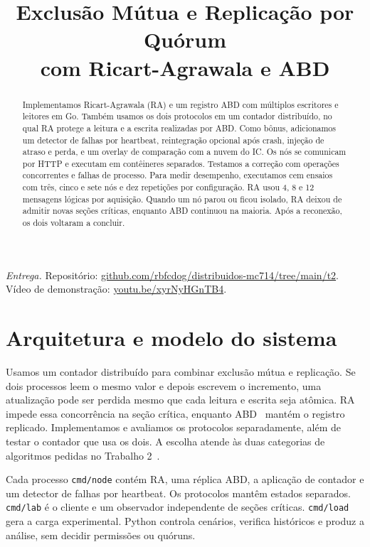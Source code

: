 \documentclass[conference]{IEEEtran}
\title{Exclusão Mútua e Replicação por Quórum\\
com Ricart-Agrawala e ABD}
\author{
\IEEEauthorblockN{%
\begin{tabular}{@{}ccc@{}}
Rodrigo Camargo & André Loubet & Gabriel Eiji M. M. Tomonari \\[0.35em]
\normalsize RA 238257 & \normalsize RA 253333 & \normalsize RA 234774
\end{tabular}}
\IEEEauthorblockA{%
MC714, Sistemas Distribuídos,\\
Universidade Estadual de Campinas}
}
\begin{document}
\maketitle

\begin{abstract}
Implementamos Ricart-Agrawala (RA) e um registro ABD com múltiplos escritores e leitores em Go. Também usamos os dois protocolos em um contador distribuído, no qual RA protege a leitura e a escrita realizadas por ABD. Como bônus, adicionamos um detector de falhas por heartbeat, reintegração opcional após crash, injeção de atraso e perda, e um overlay de comparação com a nuvem do IC. Os nós se comunicam por HTTP e executam em contêineres separados. Testamos a correção com operações concorrentes e falhas de processo. Para medir desempenho, executamos cem ensaios com três, cinco e sete nós e dez repetições por configuração. RA usou 4, 8 e 12 mensagens lógicas por aquisição. Quando um nó parou ou ficou isolado, RA deixou de admitir novas seções críticas, enquanto ABD continuou na maioria. Após a reconexão, os dois voltaram a concluir.
\end{abstract}

{\footnotesize\noindent\textit{Entrega.} Repositório: \href{https://github.com/rbfcdog/distribuidos-mc714/tree/main/t2}{github.com/rbfcdog/distribuidos-mc714/tree/main/t2}. Vídeo de demonstração: \href{https://youtu.be/xyrNyHGnTB4}{youtu.be/xyrNyHGnTB4}.\par}

\section{Arquitetura e modelo do sistema}
Usamos um contador distribuído para combinar exclusão mútua e replicação. Se dois processos leem o mesmo valor e depois escrevem o incremento, uma atualização pode ser perdida mesmo que cada leitura e escrita seja atômica. RA~\cite{ricart} impede essa concorrência na seção crítica, enquanto ABD~\cite{abd,mwmr} mantém o registro replicado. Implementamos e avaliamos os protocolos separadamente, além de testar o contador que usa os dois. A escolha atende às duas categorias de algoritmos pedidas no Trabalho 2~\cite{enunciado}.

Cada processo \texttt{cmd/node} contém RA, uma réplica ABD, a aplicação de contador e um detector de falhas por heartbeat. Os protocolos mantêm estados separados. \texttt{cmd/lab} é o cliente e um observador independente de seções críticas. \texttt{cmd/load} gera a carga experimental. Python controla cenários, verifica históricos e produz a análise, sem decidir permissões ou quóruns.
\end{document}
